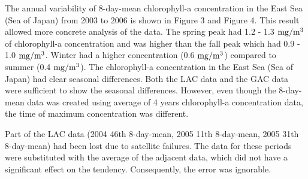   
  The annual variability of 8-day-mean chlorophyll-a concentration in the East Sea (Sea of Japan) from 2003 to 2006 is shown in Figure 3 and Figure 4. This result allowed more concrete analysis of the data. The spring peak had 1.2 - 1.3 $\rm mg/m^3$ of chlorophyll-a concentration and was higher than the fall peak which had 0.9 - 1.0 $\rm mg/m^3$. Winter had a higher concentration (0.6 $\rm mg/m^3$) compared to summer (0.4 $\rm mg/m^3$). The chlorophyll-a concentration in the East Sea (Sea of Japan) had clear seasonal differences. Both the LAC data and the GAC data were sufficient to show the seasonal differences. However, even though the 8-day-mean data was created using average of 4 years chlorophyll-a concentration data, the time of maximum concentration was different. 
  
  Part of the LAC data (2004 46th 8-day-mean, 2005 11th 8-day-mean, 2005 31th 8-day-mean) had been lost due to satellite failures. The data for these periods were substituted with the average of the adjacent data, which did not have a significant effect on the tendency. Consequently, the error was ignorable.
 
